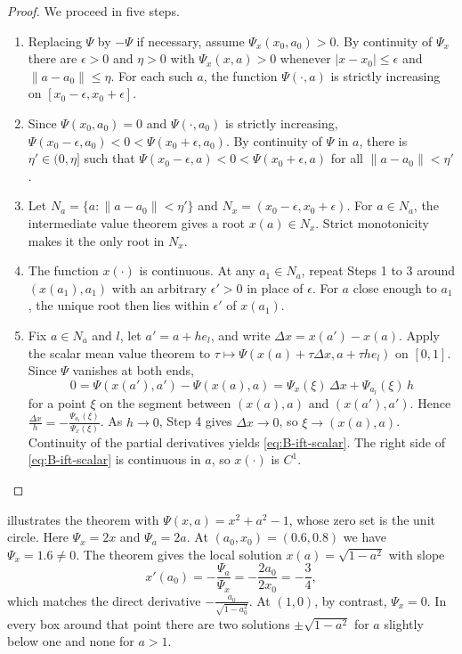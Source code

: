 \begin{proof}
We proceed in five steps.
\begin{enumerate}[label=Step \arabic*., leftmargin=*, align=left]
  \item Replacing $\Psi$ by $-\Psi$ if necessary, assume $\Psi_x(x_0, a_0) > 0$. By continuity of $\Psi_x$ there are
  $\epsilon > 0$ and $\eta > 0$ with $\Psi_x(x, a) > 0$ whenever $|x - x_0| \leq \epsilon$ and $\|a - a_0\| \leq \eta$. For
  each such $a$, the function $\Psi(\cdot, a)$ is strictly increasing on $[x_0 - \epsilon, x_0 + \epsilon]$.
  \item Since $\Psi(x_0, a_0) = 0$ and $\Psi(\cdot, a_0)$ is strictly increasing,
  $\Psi(x_0 - \epsilon, a_0) < 0 < \Psi(x_0 + \epsilon, a_0)$. By continuity of $\Psi$ in $a$, there is $\eta' \in (0, \eta]$
  such that $\Psi(x_0 - \epsilon, a) < 0 < \Psi(x_0 + \epsilon, a)$ for all $\|a - a_0\| < \eta'$.
  \item Let $N_a = \{a : \|a - a_0\| < \eta'\}$ and $N_x = (x_0 - \epsilon, x_0 + \epsilon)$. For $a \in N_a$, the intermediate
  value theorem gives a root $x(a) \in N_x$. Strict monotonicity makes it the only root in $N_x$.
  \item The function $x(\cdot)$ is continuous. At any $a_1 \in N_a$, repeat Steps 1 to 3 around $(x(a_1), a_1)$ with an
  arbitrary $\epsilon' > 0$ in place of $\epsilon$. For $a$ close enough to $a_1$, the unique root then lies within
  $\epsilon'$ of $x(a_1)$.
  \item Fix $a \in N_a$ and $l$, let $a' = a + h e_l$, and write $\Delta x = x(a') - x(a)$. Apply the scalar mean value
  theorem to $\tau \mapsto \Psi(x(a) + \tau\Delta x, a + \tau h e_l)$ on $[0, 1]$. Since $\Psi$ vanishes at both ends,
  \begin{equation*}
  0 = \Psi(x(a'), a') - \Psi(x(a), a) = \Psi_x(\xi)\,\Delta x + \Psi_{a_l}(\xi)\,h
  \end{equation*}
  for a point $\xi$ on the segment between $(x(a), a)$ and $(x(a'), a')$. Hence
  $\frac{\Delta x}{h} = -\frac{\Psi_{a_l}(\xi)}{\Psi_x(\xi)}$. As $h \to 0$, Step 4 gives $\Delta x \to 0$, so
  $\xi \to (x(a), a)$. Continuity of the partial derivatives yields \eqref{eq:B-ift-scalar}. The right side of
  \eqref{eq:B-ift-scalar} is continuous in $a$, so $x(\cdot)$ is $C^1$. \qedhere
\end{enumerate}
\end{proof}

 illustrates the theorem with $\Psi(x, a) = x^2 + a^2 - 1$, whose zero set is the unit circle. Here
$\Psi_x = 2x$ and $\Psi_a = 2a$. At $(a_0, x_0) = (0.6, 0.8)$ we have $\Psi_x = 1.6 \neq 0$. The theorem gives the
local solution $x(a) = \sqrt{1 - a^2}$ with slope
\begin{equation*}
x'(a_0) = -\frac{\Psi_a}{\Psi_x} = -\frac{2a_0}{2x_0} = -\frac{3}{4} ,
\end{equation*}
which matches the direct derivative $-\frac{a_0}{\sqrt{1 - a_0^2}}$. At $(1, 0)$, by contrast, $\Psi_x = 0$. In every box
around that point there are two solutions $\pm\sqrt{1 - a^2}$ for $a$ slightly below one and none for $a > 1$.

